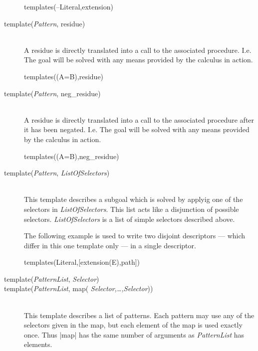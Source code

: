\begin{description}
	
    \begin{BoxedSample}
      templates(--Literal,extension)%
    \end{BoxedSample}

  \item [template({\em Pattern}, residue)]\ 
    \\
    A residue is directly translated into a call to the associated
    procedure. I.e. The goal will be solved with any means provided by the
    calculus in action.

    \begin{BoxedSample}
      templates((A=B),residue)%
    \end{BoxedSample}

  \item [template({\em Pattern}, neg\_residue)]\index{Capri!neg residue
      template}\ 
    \\
    A residue is directly translated into a call to the associated procedure
    after it has been negated. I.e. The goal will be solved with any means
    provided by the calculus in action.

    \begin{BoxedSample}
      templates((A=B),neg\_residue)%
    \end{BoxedSample}

  \item [template({\em Pattern}, {\em ListOfSelectors})]\ 
    \\
    This template describes a subgoal which is solved by applyig one of the
    selectors in {\em ListOfSelectors}. This list acts like a disjunction of
    possible selectors. {\em ListOfSelectors} is a list of simple selectors
    described above.

    The following example is used to write two disjoint descriptors --- which
    differ in this one template only --- in a single descriptor.

    \begin{BoxedSample}
      templates(Literal,[extension(E),path])%
    \end{BoxedSample}


  \item [template({\em PatternList}, {\em Selector})]

  \item [template({\em PatternList}, map({\em
      Selector,\ldots,Selector}))]\ 
    \\
    This template describes a list of patterns. Each pattern may use any of
    the selectors given in the map, but each element of the map is used
    exactly once. Thus |map| has the same number of arguments as {\em
      PatternList} has elements.


\end{description}
